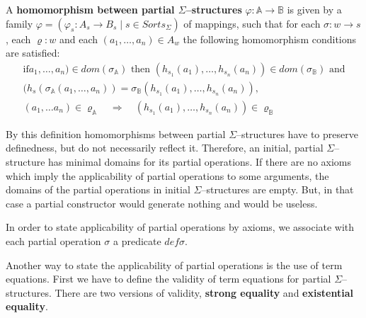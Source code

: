 \documentclass[landscape, autoslides, light]{mmiss}
\newcommand{\ns}{\normalsize}
\begin{document}
\begin{Package}[Label={FSDPT}, Title={Formal Specification of Data and Process Types}, ShortTitle={FSDPT}, Authors={Horst Reichel}, Date={February 2003}, LevelOfDetail=Lecture, Language=en-GB]
\begin{Section}[Title={Initial Algebras as Data Types}, Label={section3}]
\begin{Section}[Title={Partial Constructors}, Label={section3_5}]
\begin{Paragraph}[Label=Paragraph71]
A \textbf{homomorphism between partial $\Sigma$--structures}
$\varphi : \mathbb{A}  \to \mathbb{B}$ is given by a family
$\varphi = (\varphi_s : A_s \to B_s \;|\; s \in Sorts_{\Sigma})$
of mappings, such that  for each $\sigma : w \to s$, each $\varrho
: w$ and each $(a_1, \ldots , a_n) \in A_w$ the following
homomorphism conditions are satisfied: \small $$\begin{array}{l}
 \mbox{if
} a_1, \ldots , a_n) \in dom(\sigma_{\mathbb A}) \mbox{ then }
(h_{s_1}(a_1), \ldots , h_{s_n}(a_n)) \in dom(\sigma_{\mathbb B})
\mbox{ and}\\
 ( h_s(\sigma_{\mathbb A}(a_1, \ldots ,a_n)) =
\sigma_{\mathbb
 B}(h_{s_1}(a_1), \ldots , h_{s_n}(a_n)), \\
  (a_1, \ldots a_n) \in \varrho_{\mathbb A} \quad \Rightarrow \quad
 (h_{s_1}(a_1), \ldots , h_{s_n}(a_n)) \in \varrho_{\mathbb B}
 \end{array}$$

\end{Paragraph}
 \begin{Paragraph}[Label=Paragraph72]
\ns
 By this definition homomorphisms between partial
$\Sigma$--structures have to preserve definedness, but do not
necessarily  reflect it. Therefore, an initial, partial
$\Sigma$--structure has minimal domains for its partial
operations. If there are no axioms which imply the applicability
of partial operations to some arguments, the domains of the
partial operations in initial $\Sigma$--structures are empty. But,
in that case a partial constructor would generate nothing and
would be useless.

\end{Paragraph}
\begin{Paragraph}[Label=Paragraph73]

In order to state applicability of partial operations by axioms,
we associate with each partial operation $\sigma$ a predicate $def
\sigma$.

Another way to state the applicability of partial operations is
the use of term equations. First we have to define the validity of
term equations for partial $\Sigma$--structures. There are two
versions of validity, \textbf{strong equality} and
\textbf{existential equality}.



\end{Paragraph}
\end{Section}
\end{Section}
\end{Package}
\end{document}
